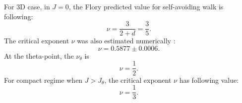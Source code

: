 For 3D case, in $J=0$, the Flory predicted value for self-avoiding walk is following:
\begin{equation}
\label{eq:nu_3D_J0_flory}
 \nu = \frac{3}{2+d} = \frac{3}{5}.
\end{equation}
The critical exponent $\nu$ was also estimated numerically \cite{Li1995}:
\begin{equation}
\label{eq:nu_3D_J0_sokal}
\nu = 0.5877 \pm 0.0006.
\end{equation}
 At the theta-point, the $\nu_{\theta}$  is \cite{van2015statistical} 
 \begin{equation}
 \label{eq:nu_3D_Jtheta_flory}
 \nu = \frac{1}{2}.
 \end{equation}
 For compact regime when $J > J_{\theta}$, the critical exponent $\nu$  has following value:  
\begin{equation}
\label{eq:nu_3D_Jglobular_flory}
\nu = \frac{1}{3}.
\end{equation}
